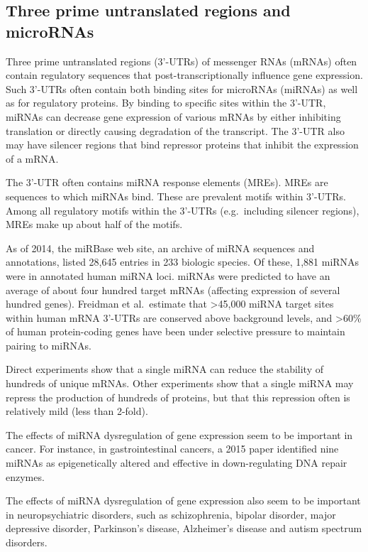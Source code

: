 \hypertarget{three-prime-untranslated-regions-and-micrornas}{%
\subsection{Three prime untranslated regions and microRNAs}\label{three-prime-untranslated-regions-and-micrornas}}

Three prime untranslated regions (3'-UTRs) of messenger RNAs (mRNAs) often contain regulatory sequences that post-transcriptionally influence gene expression. Such 3'-UTRs often contain both binding sites for microRNAs (miRNAs) as well as for regulatory proteins. By binding to specific sites within the 3'-UTR, miRNAs can decrease gene expression of various mRNAs by either inhibiting translation or directly causing degradation of the transcript. The 3'-UTR also may have silencer regions that bind repressor proteins that inhibit the expression of a mRNA.

The 3'-UTR often contains miRNA response elements (MREs). MREs are sequences to which miRNAs bind. These are prevalent motifs within 3'-UTRs. Among all regulatory motifs within the 3'-UTRs (e.g.~including silencer regions), MREs make up about half of the motifs.

As of 2014, the miRBase web site, an archive of miRNA sequences and annotations, listed 28,645 entries in 233 biologic species. Of these, 1,881 miRNAs were in annotated human miRNA loci. miRNAs were predicted to have an average of about four hundred target mRNAs (affecting expression of several hundred genes). Freidman et al.~estimate that \textgreater{}45,000 miRNA target sites within human mRNA 3'-UTRs are conserved above background levels, and \textgreater{}60\% of human protein-coding genes have been under selective pressure to maintain pairing to miRNAs.

Direct experiments show that a single miRNA can reduce the stability of hundreds of unique mRNAs. Other experiments show that a single miRNA may repress the production of hundreds of proteins, but that this repression often is relatively mild (less than 2-fold).

The effects of miRNA dysregulation of gene expression seem to be important in cancer. For instance, in gastrointestinal cancers, a 2015 paper identified nine miRNAs as epigenetically altered and effective in down-regulating DNA repair enzymes.

The effects of miRNA dysregulation of gene expression also seem to be important in neuropsychiatric disorders, such as schizophrenia, bipolar disorder, major depressive disorder, Parkinson's disease, Alzheimer's disease and autism spectrum disorders.

